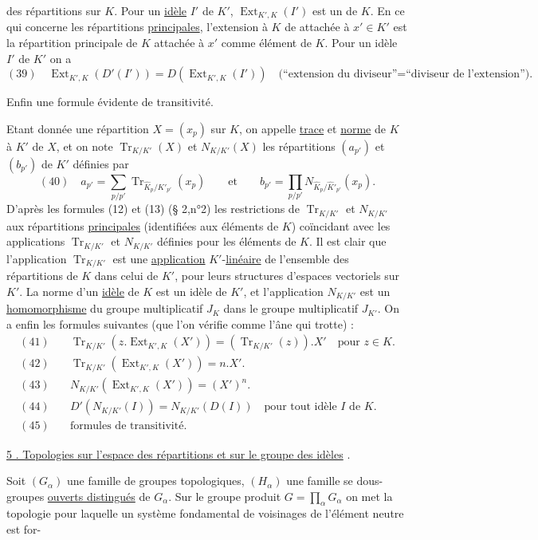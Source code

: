 
 des répartitions sur $K$. Pour un \uline{idèle} $I'$ de $K'$,
$\operatorname{Ext}_{K',K}(I')$ est un 
de $K$. En ce qui concerne les répartitions \uline{principales}, l'extension à $K$ de 
attachée à $x'\in K'$ est la répartition principale de $K$ attachée à $x'$ 
comme élément de $K$. Pour un idèle $I'$ de $K'$ on a
\[
(39)\quad \operatorname{Ext}_{K',K}(D'(I'))=D(\operatorname{Ext}_{K',K}(I'))
\quad\text{(``extension du diviseur''=``diviseur de l'extension'').}
\]

Enfin une formule évidente de transitivité.

Etant donnée une répartition $X=(x_p)$ sur $K$, on appelle \uline{trace} et \uline{norme} de $K$ à
$K'$ de $X$, et on note $\operatorname{Tr}_{K/K'}(X)$ et $N_{K/K'}(X)$ les répartitions $(a_{p'})$ et $(b_{p'})$ de
$K'$ définies par
\[
(40)\quad a_{p'}=\sum_{p/p'}\operatorname{Tr}_{\widehat K_p/\widehat K'_{p'}}(x_p)
\qquad\text{et}\qquad
b_{p'}=\prod_{p/p'}N_{\widehat K_p/\widehat K'_{p'}}(x_p).
\]
D'après les formules (12) et (13) (§ 2,n°2) les restrictions de $\operatorname{Tr}_{K/K'}$ et
$N_{K/K'}$ aux répartitions \uline{principales} (identifiées aux éléments de $K$) coïncidant
avec les applications $\operatorname{Tr}_{K/K'}$ et $N_{K/K'}$ définies pour les éléments de $K$. Il est
clair que l'application $\operatorname{Tr}_{K/K'}$ est une \uline{application} $K'$-\uline{linéaire} de l'ensemble
des répartitions de $K$ dans celui de $K'$, pour leurs structures d'espaces vectoriels sur $K'$.
La norme d'un \uline{idèle} de $K$ est un idèle de $K'$, et l'application
$N_{K/K'}$ est un \uline{homomorphisme} du groupe multiplicatif $J_K$ dans le groupe multiplicatif $J_{K'}$.
On a enfin les formules suivantes (que l'on vérifie comme l'âne
qui trotte) :
\[
\begin{aligned}
(41)\quad&\operatorname{Tr}_{K/K'}(z.\operatorname{Ext}_{K',K}(X'))=(\operatorname{Tr}_{K/K'}(z)).X'
\quad\text{pour }z\in K.\\
(42)\quad&\operatorname{Tr}_{K/K'}(\operatorname{Ext}_{K',K}(X'))=n.X'.\\
(43)\quad&N_{K/K'}(\operatorname{Ext}_{K',K}(X'))=(X')^n.\\
(44)\quad&D'(N_{K/K'}(I))=N_{K/K'}(D(I))\quad\text{pour tout idèle }I\text{ de }K.\\
(45)\quad&\text{formules de transitivité.}
\end{aligned}
\]

\uline{5 . Topologies sur l'espace des répartitions et sur le groupe des idèles} .

Soit $(G_\alpha)$ une famille de groupes topologiques, $(H_\alpha)$ une famille se dous-groupes
\uline{ouverts distingués} de $G_\alpha$. Sur le groupe produit $G=\prod_\alpha G_\alpha$ on met la topologie
pour laquelle un système fondamental de voisinages de l'élément neutre est for-

